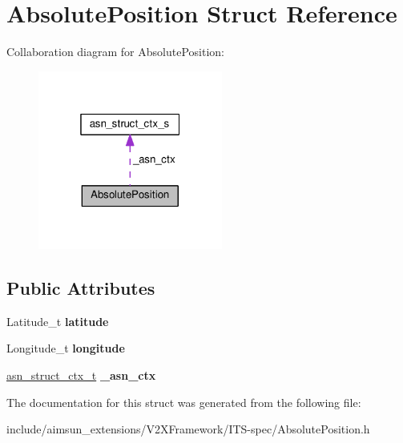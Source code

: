 \hypertarget{structAbsolutePosition}{}\section{Absolute\+Position Struct Reference}
\label{structAbsolutePosition}


Collaboration diagram for Absolute\+Position\+:\nopagebreak
\begin{figure}[H]
\begin{center}
\leavevmode
\includegraphics[width=172pt]{structAbsolutePosition__coll__graph}
\end{center}
\end{figure}
\subsection*{Public Attributes}
\begin{DoxyCompactItemize}
\item 
Latitude\+\_\+t {\bfseries latitude}\hypertarget{structAbsolutePosition_ae303886fea2dcb552c00198f70b8b36c}{}\label{structAbsolutePosition_ae303886fea2dcb552c00198f70b8b36c}

\item 
Longitude\+\_\+t {\bfseries longitude}\hypertarget{structAbsolutePosition_a9991c445539d9d4f49a20e70c2c64cef}{}\label{structAbsolutePosition_a9991c445539d9d4f49a20e70c2c64cef}

\item 
\hyperlink{structasn__struct__ctx__s}{asn\+\_\+struct\+\_\+ctx\+\_\+t} {\bfseries \+\_\+asn\+\_\+ctx}\hypertarget{structAbsolutePosition_a74f770a0614465f88f00a7764a858525}{}\label{structAbsolutePosition_a74f770a0614465f88f00a7764a858525}

\end{DoxyCompactItemize}


The documentation for this struct was generated from the following file\+:\begin{DoxyCompactItemize}
\item 
include/aimsun\+\_\+extensions/\+V2\+X\+Framework/\+I\+T\+S-\/spec/Absolute\+Position.\+h\end{DoxyCompactItemize}
